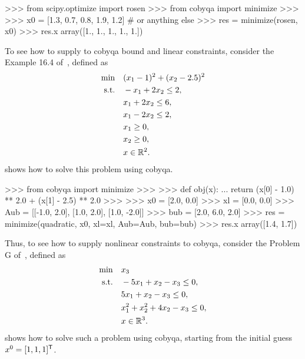 \begin{lstpython}[%
    caption=Solving the Rosenbrock problem using \gls{cobyqa},
    label=lst:cobyqa-rosenbrock,
]
    >>> from scipy.optimize import rosen
    >>> from cobyqa import minimize
    >>>
    >>> x0 = [1.3, 0.7, 0.8, 1.9, 1.2]  # or anything else
    >>> res = minimize(rosen, x0)
    >>> res.x
    array([1., 1., 1., 1., 1.]) 
\end{lstpython}

To see how to supply to \gls{cobyqa} bound and linear constraints, consider the Example 16.4 of~\cite{Nocedal_Wright_2006}, defined as
\begin{align*}
    \min        & \quad (\iter_1 - 1)^2 + (\iter_2 - 2.5)^2\\
    \text{s.t.} & \quad -\iter_1 + 2 \iter_2 \le 2,\\
                & \quad \iter_1 + 2 \iter_2 \le 6,\\
                & \quad \iter_1 - 2 \iter_2 \le 2,\\
                & \quad \iter_1 \ge 0,\\
                & \quad \iter_2 \ge 0,\\
                & \quad \iter \in \R^2.
\end{align*}
 shows how to solve this problem using \gls{cobyqa}.

\begin{lstpython}[%
    caption=An example of \gls{cobyqa} with linear constraints,
    label=lst:cobyqa-bound-linear,
]
    >>> from cobyqa import minimize
    >>>
    >>> def obj(x):
    ...     return (x[0] - 1.0) ** 2.0 + (x[1] - 2.5) ** 2.0
    >>>
    >>> x0 = [2.0, 0.0]
    >>> xl = [0.0, 0.0]
    >>> Aub = [[-1.0, 2.0], [1.0, 2.0], [1.0, -2.0]]
    >>> bub = [2.0, 6.0, 2.0]
    >>> res = minimize(quadratic, x0, xl=xl, Aub=Aub, bub=bub)
    >>> res.x
    array([1.4, 1.7])
\end{lstpython}

Thus, to see how to supply nonlinear constraints to \gls{cobyqa}, consider the Problem G of~\cite{Powell_1994}, defined as
\begin{align*}
    \min        & \quad \iter_3\\
    \text{s.t.} & \quad -5 \iter_1 + \iter_2 - \iter_3 \le 0,\\
                & \quad 5 \iter_1 + \iter_2 - \iter_3 \le 0,\\
                & \quad \iter_1^2 + \iter_2^2 + 4 \iter_2 - \iter_3 \le 0,\\
                & \quad \iter \in \R^3.
\end{align*}
 shows how to solve such a problem using \gls{cobyqa}, starting from the initial guess~$\iter[0] = [1, 1, 1]^{\T}$.

